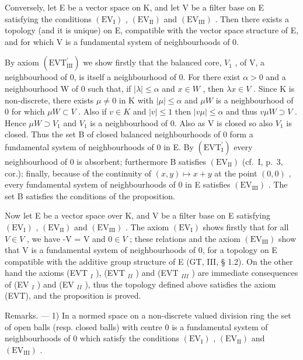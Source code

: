 Conversely, let E be a vector space on K, and let V be a filter base on E satisfying the conditions \((\mathrm{EV}_{\mathrm{I}})\) , \((\mathrm{EV}_{\mathrm{II}})\) and \((\mathrm{EV}_{\mathrm{III}})\) . Then there exists a topology (and it is unique) on E, compatible with the vector space structure of E, and for which V is a fundamental system of neighbourhoods of 0.

By axiom \((\mathrm{EVT}_{\mathrm{III}}^{\prime})\) we show firstly that the balanced core, \(V_{1}\) , of V, a neighbourhood of 0, is itself a neighbourhood of 0. For there exist \(\alpha > 0\) and a neighbourhood W of 0 such that, if \(|\lambda| \leqslant \alpha\) and \(x \in W\) , then \(\lambda x \in V\) . Since K is non-discrete, there exists \(\mu \neq 0\) in K with \(|\mu| \leqslant \alpha\) and \(\mu W\) is a neighbourhood of 0 for which \(\mu W \subset V\) . Also if \(v \in K\) and \(|v| \leqslant 1\) then \(|v\mu| \leqslant \alpha\) and thus \(v\mu W \supset V\) . Hence \(\mu W \supset V_{1}\) and \(V_{1}\) is a neighbourhood of 0. Also as V is closed so also \(V_{1}\) is closed. Thus the set B of closed balanced neighbourhoods of 0 form a fundamental system of neighbourhoods of 0 in E. By \((\mathrm{EVT}_{\mathrm{I}}^{\prime})\) every neighbourhood of 0 is absorbent; furthermore B satisfies \((\mathrm{EV}_{\mathrm{II}})\) (cf.~I, p.~3, cor.); finally, because of the continuity of \((x, y) \mapsto x + y\) at the point \((0, 0)\) , every fundamental system of neighbourhoods of 0 in E satisfies \((\mathrm{EV}_{\mathrm{III}})\) . The set B satisfies the conditions of the proposition.

Now let E be a vector space over K, and V be a filter base on E satisfying \((\mathrm{EV}_{\mathrm{I}})\) , \((\mathrm{EV}_{\mathrm{II}})\) and \((\mathrm{EV}_{\mathrm{III}})\) . The axiom \((\mathrm{EV}_{\mathrm{I}})\) shows firstly that for all \(V \in V\) , we have -V = V and \(0 \in V\) ; these relations and the axiom \((\mathrm{EV}_{\mathrm{III}})\) show that V is a fundamental system of neighbourhoods of 0, for a topology on E compatible with the additive group structure of E (GT, III, § 1.2). On the other hand the axioms (EVT \(_{I}\) ), (EVT \(_{II}\) ) and (EVT \(_{III}\) ) are immediate consequences of (EV \(_{I}\) ) and (EV \(_{II}\) ), thus the topology defined above satisfies the axiom (EVT), and the proposition is proved.

Remarks. --- 1) In a normed space on a non-discrete valued division ring the set of open balls (resp. closed balls) with centre 0 is a fundamental system of neighbourhoods of 0 which satisfy the conditions \((\mathrm{EV}_{\mathrm{I}})\) , \((\mathrm{EV}_{\mathrm{II}})\) and \((\mathrm{EV}_{\mathrm{III}})\) .

